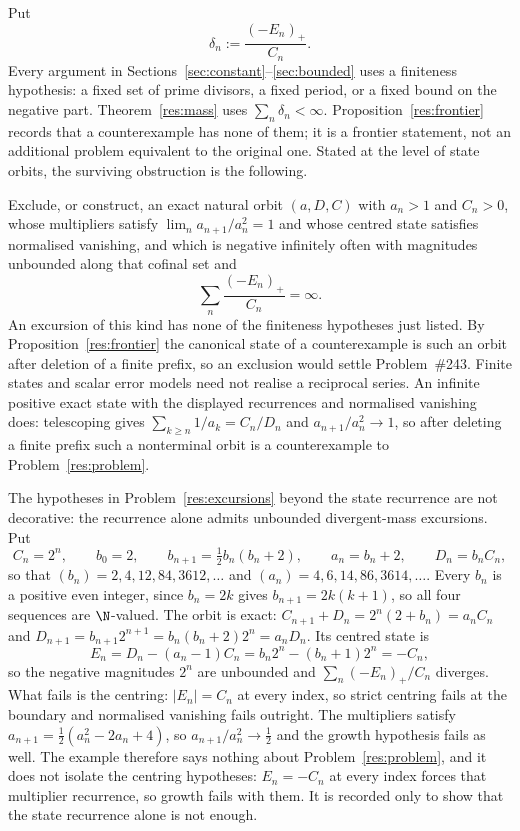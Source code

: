 Put
\[
 \delta_n:=\frac{(-E_n)_+}{C_n}.
\]
Every argument in Sections~\ref{sec:constant}--\ref{sec:bounded} uses a
finiteness hypothesis: a fixed set of prime divisors, a fixed period, or a
fixed bound on the negative part.  Theorem~\ref{res:mass} uses
$\sum_n\delta_n<\infty$.  Proposition~\ref{res:frontier} records that a
counterexample has none of them; it is a frontier statement, not an additional
problem equivalent to the original one.  Stated at the level of state orbits,
the surviving obstruction is the following.

\begin{problem}\label{res:excursions}
Exclude, or construct, an exact natural orbit $(a,D,C)$ with $a_n>1$ and
$C_n>0$, whose multipliers satisfy $\lim_n a_{n+1}/a_n^{2}=1$ and whose centred
state satisfies normalised vanishing, and which is
negative infinitely often with magnitudes unbounded along that cofinal set and
\[
 \sum_n\frac{(-E_n)_+}{C_n}=\infty .
\]
An excursion of this kind has none of the finiteness hypotheses just listed.
By Proposition~\ref{res:frontier} the canonical state of a counterexample is
such an orbit after deletion of a finite prefix, so an exclusion would settle
Problem~\#243.  Finite states and scalar error models need not realise a
reciprocal series.  An infinite positive exact state with the displayed
recurrences and normalised vanishing does: telescoping gives
$\sum_{k\ge n}1/a_k=C_n/D_n$ and $a_{n+1}/a_n^2\to1$, so after deleting a
finite prefix such a nonterminal orbit is a counterexample to
Problem~\ref{res:problem}.
\end{problem}

\begin{remark}
The hypotheses in Problem~\ref{res:excursions} beyond the state recurrence are
not decorative: the recurrence alone admits unbounded divergent-mass
excursions.  Put
\[
 C_n=2^{n},\qquad b_0=2,\qquad b_{n+1}=\tfrac12 b_n(b_n+2),\qquad
 a_n=b_n+2,\qquad D_n=b_nC_n ,
\]
so that $(b_n)=2,4,12,84,3612,\ldots$ and $(a_n)=4,6,14,86,3614,\ldots$.  Every
$b_n$ is a positive even integer, since $b_n=2k$ gives $b_{n+1}=2k(k+1)$, so all
four sequences are $\N$-valued.  The orbit is exact:
$C_{n+1}+D_n=2^{n}(2+b_n)=a_nC_n$ and
$D_{n+1}=b_{n+1}2^{n+1}=b_n(b_n+2)2^{n}=a_nD_n$.  Its centred state is
\[
 E_n=D_n-(a_n-1)C_n=b_n2^{n}-(b_n+1)2^{n}=-C_n ,
\]
so the negative magnitudes $2^{n}$ are unbounded and $\sum_n(-E_n)_+/C_n$
diverges.  What fails is the centring: $|E_n|=C_n$ at every index, so strict
centring fails at the boundary and normalised vanishing fails outright.  The
multipliers satisfy $a_{n+1}=\tfrac12(a_n^{2}-2a_n+4)$, so
$a_{n+1}/a_n^{2}\to\tfrac12$ and the growth hypothesis fails as well.  The
example therefore says nothing about Problem~\ref{res:problem}, and it does not
isolate the centring hypotheses: $E_n=-C_n$ at every index forces that
multiplier recurrence, so growth fails with them.  It is recorded only to show
that the state recurrence alone is not enough.
\end{remark}

